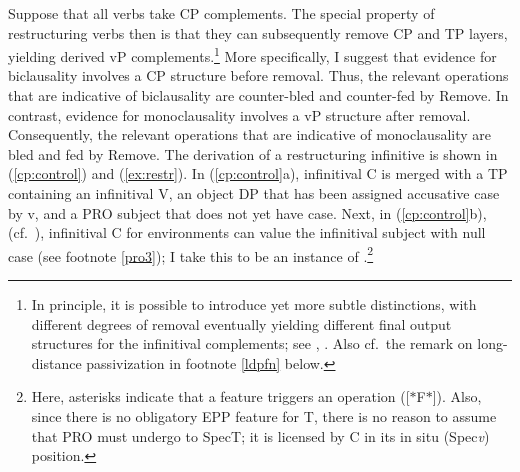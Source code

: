 \documentclass[output=paper]{langsci/langscibook}
\begin{document}
Suppose that all  verbs take CP complements.  The special property of
restructuring  verbs then is that they can subsequently remove CP and TP
layers, yielding derived vP complements.\footnote{In principle, it is possible
    to introduce yet more subtle distinctions, with different degrees of
    removal eventually yielding different final output structures for the
    infinitival complements; see \cite{Fanselow:91},
    \cite{Wurmbrand:01,Wurmbrand:15}. Also cf.\ the remark on long-distance
passivization in footnote \ref{ldpfn} below.} More specifically, I suggest that
evidence for biclausality involves a CP structure before removal. Thus, the
relevant operations that are indicative of biclausality are counter-bled and
counter-fed by Remove. In contrast, evidence for monoclausality involves a vP
structure after removal. Consequently, the relevant operations that are
indicative of monoclausality are bled and fed by Remove.  The derivation of a
restructuring  infinitive is shown in (\ref{cp:control}) and
(\ref{ex:restr}). In (\ref{cp:control}a), infinitival C is merged with a TP
containing an infinitival V, an object DP that has been assigned accusative
case by v, and a PRO subject that does not yet have case. Next, in
(\ref{cp:control}b), (cf.\ ), infinitival C for 
environments can value the infinitival subject with null case (see footnote
\ref{pro3}); I take this to be an instance of .\footnote{Here, asterisks
    indicate that a feature triggers an  operation ([$*$F$*$]).  Also,
    since there is no obligatory \gls{EPP} feature for  T, there is no reason
    to assume that PRO must undergo  to SpecT; it is licensed by C in
its in situ (Spec\emph{v}) position.}\newpage
\end{document}
